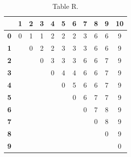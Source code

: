\documentclass{article}
\begin{document}
\begin{table}[!ht]
\begin{adjustwidth}{-3cm}{-3cm}
\centering
\begin{tabular}{c||c|c|c|c|c|c|c|c|c|c|}
\cline{2-11}
 & \cellcolor{gray90}\textbf{1} & \cellcolor{gray90}\textbf{2} & \cellcolor{gray90}\textbf{3} & \cellcolor{gray90}\textbf{4} & \cellcolor{gray90}\textbf{5} & \cellcolor{gray90}\textbf{6} & \cellcolor{gray90}\textbf{7} & \cellcolor{gray90}\textbf{8} & \cellcolor{gray90}\textbf{9} & \cellcolor{gray90}\textbf{10} \\
\hline\hline
\multicolumn{1}{|c||}{\cellcolor{gray90}\textbf{0}} & 0 & 1 & 1 & 2 & 2 & 2 & 3 & 6 & 6 & 9 \\ \hline
\multicolumn{1}{|c||}{\cellcolor{gray90}\textbf{1}} &  & 0 & 2 & 2 & 3 & 3 & 3 & 6 & 6 & 9 \\ \hline
\multicolumn{1}{|c||}{\cellcolor{gray90}\textbf{2}} &  &  & 0 & 3 & 3 & 3 & 6 & 6 & 7 & 9 \\ \hline
\multicolumn{1}{|c||}{\cellcolor{gray90}\textbf{3}} &  &  &  & 0 & 4 & 4 & 6 & 6 & 7 & 9 \\ \hline
\multicolumn{1}{|c||}{\cellcolor{gray90}\textbf{4}} &  &  &  &  & 0 & 5 & 6 & 6 & 7 & 9 \\ \hline
\multicolumn{1}{|c||}{\cellcolor{gray90}\textbf{5}} &  &  &  &  &  & 0 & 6 & 7 & 7 & 9 \\ \hline
\multicolumn{1}{|c||}{\cellcolor{gray90}\textbf{6}} &  &  &  &  &  &  & 0 & 7 & 8 & 9 \\ \hline
\multicolumn{1}{|c||}{\cellcolor{gray90}\textbf{7}} &  &  &  &  &  &  &  & 0 & 8 & 9 \\ \hline
\multicolumn{1}{|c||}{\cellcolor{gray90}\textbf{8}} &  &  &  &  &  &  &  &  & 0 & 9 \\ \hline
\multicolumn{1}{|c||}{\cellcolor{gray90}\textbf{9}} &  &  &  &  &  &  &  &  &  & 0 \\ \hline
\end{tabular}
\caption{Table R.}
\end{adjustwidth}
\end{table}
\end{document}
